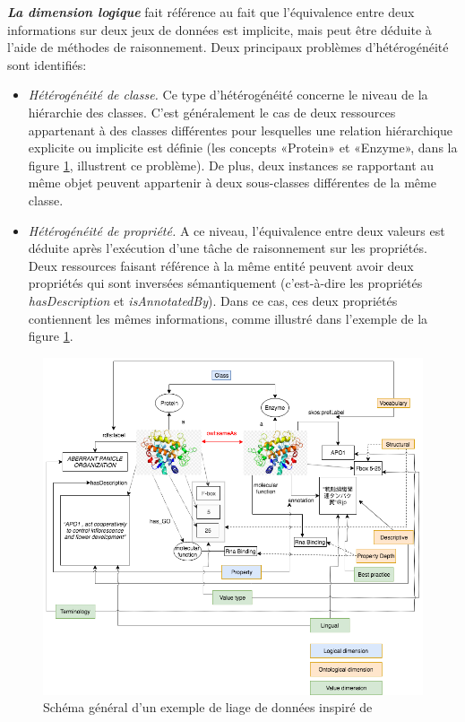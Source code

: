 \textbf{\textit{La dimension logique}} fait référence au fait que l'équivalence entre deux informations sur deux jeux de données est implicite, mais peut être déduite à l'aide de méthodes de raisonnement. Deux principaux problèmes d’hétérogénéité sont identifiés:\\
\begin{itemize}
\item \textit{Hétérogénéité de classe.} Ce type d'hétérogénéité concerne le niveau de la hiérarchie des classes. C'est généralement le cas de deux ressources appartenant à des classes différentes pour lesquelles une relation hiérarchique explicite ou implicite est définie (les concepts «Protein» et «Enzyme», dans la figure  \ref{exempleL}, illustrent ce problème). De plus, deux instances se rapportant au même objet peuvent appartenir à deux sous-classes différentes de la même classe.\\
\item \textit{Hétérogénéité de propriété.} A ce niveau, l'équivalence entre deux valeurs est déduite après l'exécution d'une tâche de raisonnement sur les propriétés. Deux ressources faisant référence à la même entité peuvent avoir deux propriétés qui sont inversées sémantiquement (c’est-à-dire les propriétés \textit{hasDescription} et \textit{isAnnotatedBy}). Dans ce cas, ces deux propriétés contiennent les mêmes informations, comme illustré dans l'exemple de la figure \ref{exempleL}.\\
\end{itemize}

\begin{figure}[!ht]
\begin{center}
	\includegraphics[width=1\textwidth]{Figures/exempleLiage.png}
\end{center}
\caption{\label{exempleL} Schéma général d'un exemple de liage de données inspiré de ~\cite{achichi2018} }
\end{figure}


